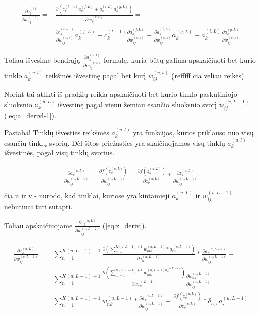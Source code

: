 \begin{equation} \label{eq:c_deriv}
  \begin{aligned}
    \frac{\partial c_k^{(t)}}{\partial w_{ij}^{(v,s)}} =&
      \frac{\partial (c_k^{(t-1)}a_k^{(f,L)}+a_k^{(i,L)}a_k^{(g,L)})}{\partial w_{ij}^{(v,s)}} =\\
  &\frac{ \partial c_k^{(t-1)}}{\partial w_{ij}^{(v,s)}}a_k^{(f,L)} +
  c_k^{(t-1)}\frac{\partial a_k^{(f,L)}}{\partial w_{ij}^{(v,s)}} +
  \frac{\partial a_k^{(i,L)}}{\partial w_{ij}^{(v,s)}}a_k^{(g,L)} +
  a_k^{(i,L)}\frac{\partial a_k^{(g,L)}}{\partial w_{ij}^{(v,s)}}
  \end{aligned}
\end{equation}

Toliau išvesime bendrąją $\frac{\partial a_k^{(u, l)}}{\partial w_{ij}^{(v,s)}}$ formulę, kuria būtų galima apskaičiuoti bet kurio tinklo $a_k^{(u, l)}$ reikšmės išvestinę pagal bet kurį $w_{ij}^{(v,s)}$ (refffff cia veliau reikės).

Norint tai atlikti iš pradžių reikia apskaičiuoti bet kurio tinklo paskutiniojo sluoksnio $a_k^{(u, L)}$ išvestinę pagal vienu žemiau esančio sluoksnio svorį $w_{ij}^{(v,L-1)}$ (\ref{eq:a_derivl-1}).

Pastaba! Tinklų išvesties reikšmės $a_k^{(u, l)}$ yra funkcijos, kurios priklauso nuo visų esančių tinklų svorių. Dėl šitos priežasties yra skaičiuojamos visų tinklų $a_k^{(u, l)}$ išvestinės, pagal visų tinklų svorius.

\begin{equation} \label{eq:a_derivl-1}
  \begin{aligned}
  \frac{\partial a_k^{(u, L)}}{\partial w_{ij}^{(v,L-1)}} =
  \frac{\partial f(z_k^{(u, L)})}{\partial w_{ij}^{(v,L-1)}} =
  \frac{\partial f(z_k^{(u, L)})}{\partial z_k^{(u,L)}} *
  \frac{\partial z_k^{(u,L)}}{\partial w_{ij}^{(v,L-1)}} \\
  \end{aligned}
\end{equation}
čia u ir v - nurodo, kad tinklai, kuriose yra kintamieji $a_k^{(u, L)}$ ir $w_{ij}^{(v,L-1)}$ nebūtinai turi sutapti.

Toliau apskaičiuojame $\frac{\partial z_k^{(u,L)}}{\partial w_{ij}^{(v,L-2)}}$ (\ref{eq:z_deriv}).

\begin{equation} \label{eq:z_deriv}
  \begin{aligned}
    \frac{\partial z_k^{(u,L)}}{\partial w_{ij}^{(v,L-1)}} =& \sum_{n=1}^{K(u, L-1)+1}
      \frac{ \partial (\sum_{m=1}^{K(u,L-1)+1} w_{mk}^{(u,L-1)} * a_m^{(u,L-1)} ) }{ \partial a_n^{(u,L-1)} } *
      \frac{\partial a_n^{(u,L-1)}}{\partial w_{ij}^{(v,L-1)}} + \\
      &\sum_{n=1}^{K(u, L-1)+1} \frac{\partial (\sum_{m=1}^{K(u,L-1)+1} w_{mk}^{(u,L-1)a_m^{(u,L-1)}} )}{\partial w_{nk}^{(v,L-1)}}
      \frac{\partial w_{nk}^{(v,L-1)}}{\partial w_{ij}^{(v,L-1)}} = \\
      &\sum_{n=1}^{K(u, L-1)+1} w_{nk}^{(u,L-1)} *   \frac{\partial a_k^{(u, L-1)}}{\partial w_{ij}^{(v,L-1)}}  +  \frac{\partial f(z_k^{(u, L)})}{\partial z_k^{(u,L)}} * \delta_{u,v} a_i^{(u,L-1)}
  \end{aligned}
\end{equation}

